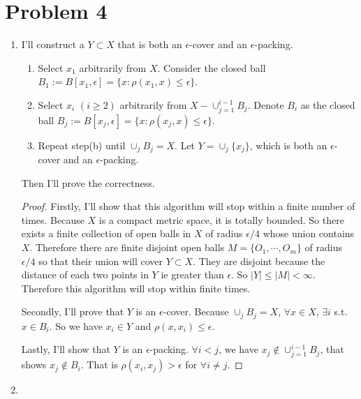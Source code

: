 \documentclass[twoside,11pt]{homework}
\begin{document}
\section*{Problem 4}
\begin{enumerate}
    \item 
    I'll construct a $Y \subset X$ that is both an $\epsilon$-cover and an $\epsilon$-packing.
    \begin{enumerate}
        \item 
        Select $x_1$ arbitrarily from $X$. Consider the closed ball $B_1 :=B[x_1, \epsilon]=\{x: \rho (x_1, x) \leq \epsilon\}$.
        \item
        Select $x_i$ $(i \geq 2)$ arbitrarily from $X - \cup_{j=1}^{i-1} B_j$. Denote $B_i$ as the closed ball  $B_j :=B[x_j, \epsilon]=\{x: \rho (x_j, x) \leq \epsilon\}$.
        \item
        Repeat step(b) until $\cup_{j}B_j = X$. Let $Y = \cup_{j}\{x_j\}$, which is both an $\epsilon$-cover and an $\epsilon$-packing.
    \end{enumerate}
    Then I'll prove the correctness.
    \begin{proof}
      Firstly, I'll show that this algorithm will stop within a finite number of times. Because $X$ is a compact metric space, it is totally bounded. So there exists a finite collection of open balls in $X$ of radius $\epsilon/4$ whose union contains $X$. Therefore there are finite disjoint open balls $M = \{O_1, \cdots, O_m\}$ of radius $\epsilon/4$ so that their union will cover $Y \subset X$. They are disjoint because the distance of each two points in $Y$ ie greater than $\epsilon$. So $|Y| \leq |M| < \infty$. Therefore this algorithm will stop within finite times.
      
      Secondly, I'll prove that $Y$ is an $\epsilon$-cover. Because $\cup_j B_j = X$, $\forall x \in X$, $\exists i$ s.t. $x \in B_i$. So we have $x_i \in Y$ and $\rho(x, x_i) \leq \epsilon$.
      
      Lastly, I'll show that $Y$ is an  $\epsilon$-packing. $\forall i<j$, we have $x_j \notin  \cup_{j=1}^{i-1} B_j$, that shows $x_j \notin B_i$. That is $\rho(x_i, x_j) > \epsilon$ for $\forall i \neq j$.
    \end{proof}
    
    
    \item
    

\end{enumerate}
\end{document}
